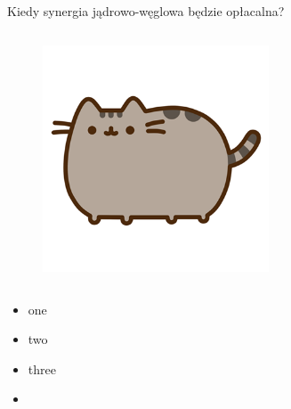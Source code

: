 \begin{columnframe}{Kiedy synergia jądrowo-węglowa będzie opłacalna?}
    \begin{column}{0.5\textwidth}
        \begin{figure}
            \centering
            \includegraphics[width=0.6\textwidth, frame]{images/pusheen.png}
        \end{figure}
    \end{column}
    \begin{column}{0.5\textwidth}
        \begin{itemize}
            \item one \keV
            \item two \MeV
            \item three \GeV
            \item \aegis
        \end{itemize}
    \end{column}
\end{columnframe}

